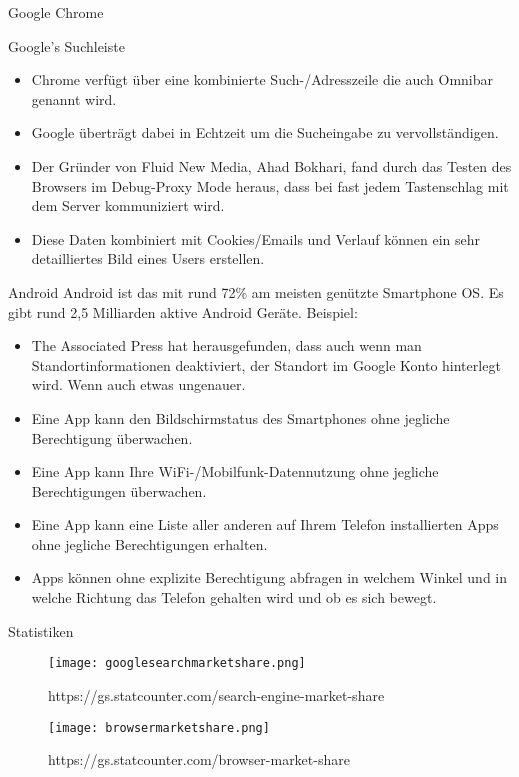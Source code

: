 \documentclass[11pt]{beamer}
\begin{document}
\begin{frame}{Google Chrome}
    \begin{block}{Google's Suchleiste}
    \begin{itemize}
        \item Chrome verfügt über eine kombinierte Such-/Adresszeile die auch Omnibar genannt wird.
        \item Google überträgt dabei in Echtzeit um die Sucheingabe zu vervollständigen.
        \item Der Gründer von Fluid New Media, Ahad Bokhari, fand durch das Testen des Browsers im Debug-Proxy Mode heraus, dass bei fast jedem Tastenschlag mit dem Server kommuniziert wird.
        \item Diese Daten kombiniert mit Cookies/Emails und Verlauf können ein sehr detailliertes Bild eines Users erstellen.
    \end{itemize}
    \end{block}
    
\end{frame}
\begin{frame}{Android}
    Android ist das mit rund 72\% am meisten genützte Smartphone OS. Es gibt rund 2,5 Milliarden aktive Android Geräte. \newline 
    Beispiel:
    \begin{itemize}
        \item The Associated Press hat herausgefunden, dass auch wenn man Standortinformationen deaktiviert, der Standort im Google Konto hinterlegt wird. Wenn auch etwas ungenauer.
        \item Eine App kann den Bildschirmstatus des Smartphones ohne jegliche Berechtigung überwachen.
        \item Eine App kann Ihre WiFi-/Mobilfunk-Datennutzung ohne jegliche Berechtigungen überwachen.
        \item Eine App kann eine Liste aller anderen auf Ihrem Telefon installierten Apps ohne jegliche Berechtigungen erhalten.
        \item Apps können ohne explizite Berechtigung abfragen in welchem Winkel und in welche Richtung das Telefon gehalten wird und ob es sich bewegt.
    \end{itemize}
\end{frame}

\begin{frame}{Statistiken}
    \begin{figure}
        \centering
        \texttt{[image: googlesearchmarketshare.png]}
        \caption{\tiny https://gs.statcounter.com/search-engine-market-share}
    \end{figure}
    \begin{figure}
        \centering
        \texttt{[image: browsermarketshare.png]}
        \caption{\tiny https://gs.statcounter.com/browser-market-share}
    \end{figure}

\end{frame}
\end{document}
